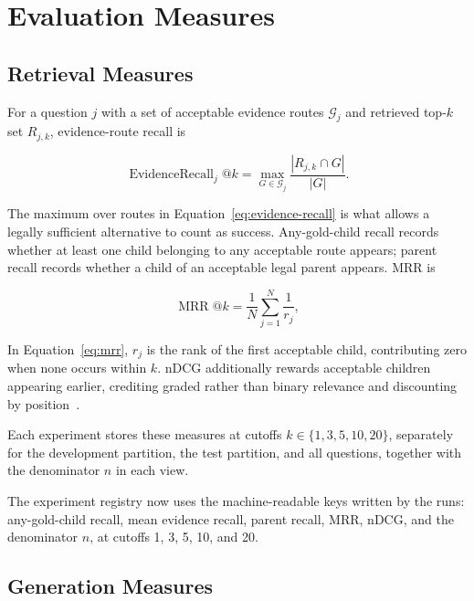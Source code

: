 \section{Evaluation Measures}
\label{sec:method-measures}

\subsection{Retrieval Measures}

For a question $j$ with a set of acceptable evidence routes $\mathcal{G}_j$ and retrieved top-$k$ set $R_{j,k}$, evidence-route recall is

\begin{equation}
\operatorname{EvidenceRecall}_{j}@k =
\max_{G \in \mathcal{G}_j}
\frac{|R_{j,k} \cap G|}{|G|}.
\label{eq:evidence-recall}
\end{equation}

The maximum over routes in Equation~\ref{eq:evidence-recall} is what allows a legally sufficient alternative to count as success. Any-gold-child recall records whether at least one child belonging to any acceptable route appears; parent recall records whether a child of an acceptable legal parent appears. \ac{MRR} is

\begin{equation}
\operatorname{MRR}@k =
\frac{1}{N}\sum_{j=1}^{N}\frac{1}{r_j},
\label{eq:mrr}
\end{equation}

In Equation~\ref{eq:mrr}, $r_j$ is the rank of the first acceptable child, contributing zero when none occurs within $k$. \ac{nDCG} additionally rewards acceptable children appearing earlier, crediting graded rather than binary relevance and discounting by position~\cite{jarvelin2002cumulated}.

Each experiment stores these measures at cutoffs $k \in \{1, 3, 5, 10, 20\}$, separately for the development partition, the test partition, and all questions, together with the denominator $n$ in each view.

The experiment registry now uses the machine-readable keys written by the runs: any-gold-child recall, mean evidence recall, parent recall, \ac{MRR}, \ac{nDCG}, and the denominator $n$, at cutoffs 1, 3, 5, 10, and 20.

\subsection{Generation Measures}

